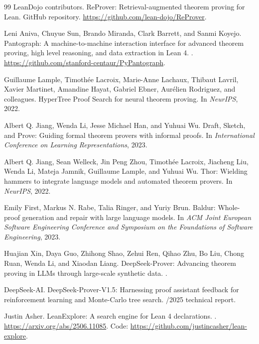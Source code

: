 \documentclass[11pt]{article}
\begin{document}
\begin{thebibliography}{99}
LeanDojo contributors.
\newblock ReProver: Retrieval-augmented theorem proving for Lean.
\newblock GitHub repository.
\newblock \url{https://github.com/lean-dojo/ReProver}.

Leni Aniva, Chuyue Sun, Brando Miranda, Clark Barrett, and Sanmi Koyejo.
\newblock Pantograph: A machine-to-machine interaction interface for advanced
theorem proving, high level reasoning, and data extraction in Lean 4.
.
\newblock \url{https://github.com/stanford-centaur/PyPantograph}.

Guillaume Lample, Timothée Lacroix, Marie-Anne Lachaux, Thibaut Lavril,
Xavier Martinet, Amandine Hayat, Gabriel Ebner, Aurélien Rodriguez, and
colleagues.
\newblock HyperTree Proof Search for neural theorem proving.
\newblock In \emph{NeurIPS}, 2022.

Albert Q. Jiang, Wenda Li, Jesse Michael Han, and Yuhuai Wu.
\newblock Draft, Sketch, and Prove: Guiding formal theorem provers with
informal proofs.
\newblock In \emph{International Conference on Learning Representations}, 2023.

Albert Q. Jiang, Sean Welleck, Jin Peng Zhou, Timothée Lacroix, Jiacheng Liu,
Wenda Li, Mateja Jamnik, Guillaume Lample, and Yuhuai Wu.
\newblock Thor: Wielding hammers to integrate language models and automated
theorem provers.
\newblock In \emph{NeurIPS}, 2022.

Emily First, Markus N. Rabe, Talia Ringer, and Yuriy Brun.
\newblock Baldur: Whole-proof generation and repair with large language models.
\newblock In \emph{ACM Joint European Software Engineering Conference and
Symposium on the Foundations of Software Engineering}, 2023.

Huajian Xin, Daya Guo, Zhihong Shao, Zehui Ren, Qihao Zhu, Bo Liu, Chong Ruan,
Wenda Li, and Xiaodan Liang.
\newblock DeepSeek-Prover: Advancing theorem proving in LLMs through large-scale
synthetic data.
.

DeepSeek-AI.
\newblock DeepSeek-Prover-V1.5: Harnessing proof assistant feedback for
reinforcement learning and Monte-Carlo tree search.
/2025 technical report.

Justin Asher.
\newblock LeanExplore: A search engine for Lean 4 declarations.
.
\newblock \url{https://arxiv.org/abs/2506.11085}.
\newblock Code: \url{https://github.com/justincasher/lean-explore}.


\end{thebibliography}
\end{document}
